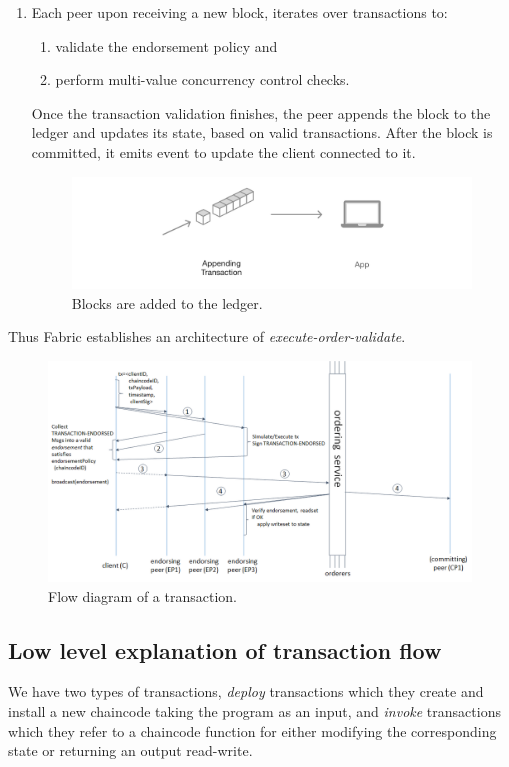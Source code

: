 \begin{enumerate}
    \item Each peer upon receiving a new block, iterates over transactions to:
    \begin{enumerate}
        \item validate the endorsement policy and
        \item  perform multi-value concurrency control checks.
    \end{enumerate}
    Once the transaction validation finishes, the peer appends the block to the ledger and updates its state, based on valid transactions. After the block is committed, it emits event to update the client connected to it.
    \begin{figure}[H]
        \centering
        \includegraphics[width=1\textwidth]{images/4_Fabric/step6.png}
        \caption{Blocks are added to the ledger.}
        \label{fig:step6}
    \end{figure}
\end{enumerate}
Thus Fabric establishes an architecture of \textit{execute-order-validate}.
\begin{figure}[H]
        \centering
        \includegraphics[width=1\textwidth]{images/4_Fabric/fabric_txFlow_normal.png}
        \caption{Flow diagram of a transaction.}
        \label{fig:tx_flox_fabric}
    \end{figure}
\subsection{Low level explanation of transaction flow}
We have two types of transactions, \textit{deploy} transactions which they create and install a new chaincode taking the program as an input, and \textit{invoke} transactions which they refer to a chaincode function for either modifying the corresponding state or returning an output read-write.

